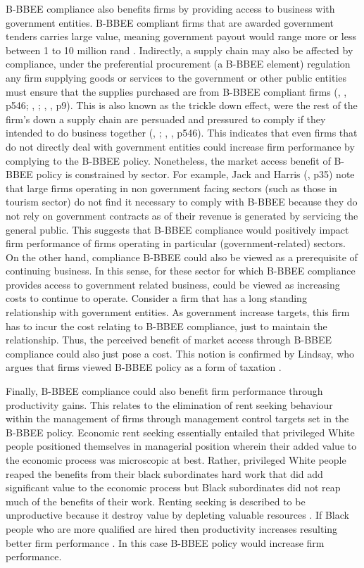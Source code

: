 B-BBEE compliance also benefits firms by providing access to business with government entities. B-BBEE compliant firms that are awarded government tenders carries large value, meaning government payout would range more or less between 1 to 10 million rand \cite[]{N58}. Indirectly, a supply chain may also be affected by compliance, under the preferential procurement (a B-BBEE element) regulation any firm supplying goods or services to the government or other public entities must ensure that the supplies purchased are from B-BBEE compliant firms (\citeauthor{N7}, \citeyear{N7}, p546; \citeauthor{N3}, \citeyear{N3}; \citeauthor{N5}, \citeyear{N5}, p9). This is also known as the trickle down effect, were the rest of the firm's down a supply chain are persuaded and pressured to comply if they intended to do business together (\citeauthor{N47}, \citeyear{N47}; \citeauthor{N7}, \citeyear{N7}, p546). This indicates that even firms that do not directly deal with government entities could increase firm performance by complying to the B-BBEE policy. Nonetheless, the market access benefit of B-BBEE policy is constrained by sector. For example, Jack and Harris (\citeyear{N4}, p35) note that large firms operating in non government facing sectors (such as those in tourism sector) do not find it necessary to comply with B-BBEE because they do not rely on government contracts as of their revenue is generated by servicing the general public. This suggests that B-BBEE compliance would positively impact firm performance of firms operating in particular (government-related) sectors. On the other hand, compliance B-BBEE could also be viewed as a prerequisite of continuing business. In this sense, for these sector for which B-BBEE compliance provides access to government related business, could be viewed as increasing costs to continue to operate. Consider a firm that has a long standing relationship with government entities. As government increase targets, this firm has to incur the cost relating to B-BBEE compliance, just to maintain the relationship. Thus, the perceived benefit of market access through B-BBEE compliance could also just pose a cost. This notion is confirmed by Lindsay, who argues that firms viewed B-BBEE policy as a form of taxation \cite[p187]{N30}.

Finally, B-BBEE compliance could also benefit firm performance through productivity gains. This relates to the elimination of rent seeking behaviour within the management of firms through management control targets set in the B-BBEE policy. Economic rent seeking essentially entailed that privileged White people positioned themselves in managerial position wherein their added value to the economic process was microscopic at best. Rather, privileged White people reaped the benefits from their black subordinates hard work that did add significant value to the economic process but Black subordinates did not reap much of the benefits of their work. Renting seeking is described to be unproductive because it destroy value by depleting valuable resources \cite[p74]{N51}.  If Black people who are more qualified are hired then productivity increases resulting better firm performance \cite[p20]{N23}. In this case B-BBEE policy would increase firm performance.
